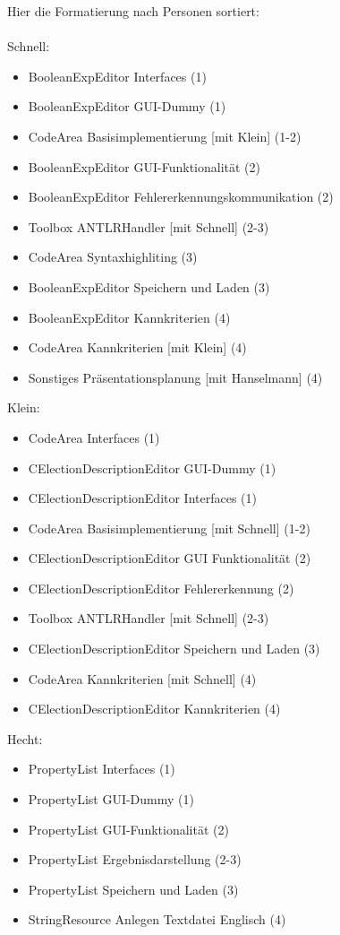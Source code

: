 \documentclass[a4paper]{scrreprt}
\begin{document}
Hier die Formatierung nach Personen sortiert: \\\\
Schnell:
\begin{itemize} 
\item BooleanExpEditor Interfaces (1)
\item BooleanExpEditor GUI-Dummy (1)
\item CodeArea Basisimplementierung [mit Klein] (1-2)
\item BooleanExpEditor GUI-Funktionalität (2)
\item BooleanExpEditor Fehlererkennungskommunikation (2) 
\item Toolbox ANTLRHandler [mit Schnell] (2-3) 
\item CodeArea Syntaxhighliting (3)
\item BooleanExpEditor Speichern und Laden (3) 
\item BooleanExpEditor Kannkriterien (4)
\item CodeArea Kannkriterien [mit Klein] (4)
\item Sonstiges Präsentationsplanung [mit Hanselmann] (4)
\end{itemize} 
\vspace{8mm}
Klein: 
\begin{itemize}
\item CodeArea Interfaces (1)
\item CElectionDescriptionEditor GUI-Dummy (1) 
\item CElectionDescriptionEditor Interfaces (1)
\item CodeArea Basisimplementierung [mit Schnell] (1-2)
\item CElectionDescriptionEditor GUI Funktionalität (2)
\item CElectionDescriptionEditor Fehlererkennung (2) 
\item Toolbox ANTLRHandler [mit Schnell] (2-3) 
\item CElectionDescriptionEditor Speichern und Laden (3)
\item CodeArea Kannkriterien [mit Schnell] (4)
\item CElectionDescriptionEditor Kannkriterien (4)
\end{itemize} 
\vspace{8mm}
Hecht: 
\begin{itemize}
\item PropertyList Interfaces (1)
\item PropertyList GUI-Dummy (1)
\item PropertyList GUI-Funktionalität (2)
\item PropertyList Ergebnisdarstellung (2-3)
\item PropertyList Speichern und Laden (3)
\item StringResource Anlegen Textdatei Englisch (4)
\end{itemize} 
\end{document}
